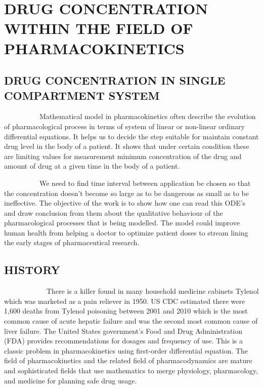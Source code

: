 \chapter[PHARMACOKINETICS]{\textbf{DRUG CONCENTRATION WITHIN THE FIELD OF PHARMACOKINETICS}}
\thispagestyle{empty}


\section{DRUG CONCENTRATION IN SINGLE COMPARTMENT SYSTEM}
\par ~~~~~~~~~~Mathematical model in pharmacokinetics often describe the evolution of pharmacological process in terms of system of linear or non-linear ordinary differential equations. It helps us to decide the step suitable for maintain constant drug level in the body of a patient. It shows that under certain condition these are limiting values for measurement minimum concentration of the drug and amount of drug at a given time in the body of a patient.

\par ~~~~~~~~~~We need to find time interval between application be chosen so that the concentration doesn't become so large as to be dangerous as small as to be ineffective. The objective of the work is to show how one can read this ODE's and draw conclusion from them about the qualitative behaviour of the pharmacological processes that is being modelled. The model could improve human health from helping a doctor to optimize patient doses to stream lining the early stages of pharmaceutical research.

\section*{HISTORY}
~~~~~~~~~~~~There is a killer found in many household medicine cabinets  Tylenol which was marketed as a pain reliever in 1950. US CDC estimated there were 1,600 deaths from Tylenol poisoning between 2001 and 2010 which is the most common cause of acute hepatic failure and was the second most common cause of liver failure. The United States government’s Food and Drug Administration (FDA) provides recommendations for dosages and frequency of use.
This is a classic problem in pharmacokinetics using first-order differential equation. The field of pharmacokinetics and the related field of pharmacodynamics are mature and sophisticated fields that use mathematics to merge physiology, pharmacology, and medicine for planning safe drug usage.
 

